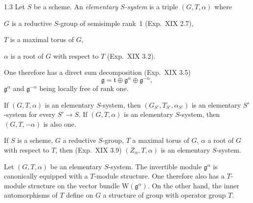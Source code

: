 \begin{definition}{1.3}\label{XX.1.3}
Let $S$ be a scheme. An \emph{elementary $S$-system} is a triple $(G,T,\alpha)$ where
\begin{enumeratei}
\item $G$ is a reductive $S$-group of semisimple rank~1 (Exp.~XIX 2.7),
\item $T$ is a maximal torus of $G$,
\item $\alpha$ is a root of $G$ with respect to $T$ (Exp.~XIX 3.2).
\end{enumeratei}
\end{definition}
One therefore has a direct sum decomposition (Exp.~XIX 3.5){\renewcommand{\thefootnote}{(1)}}
\[
\mathfrak g=\mathfrak t\oplus\mathfrak g^\alpha\oplus\mathfrak g^{-\alpha},
\]
$\mathfrak g^\alpha$ and $\mathfrak g^{-\alpha}$ being locally free of rank one.

 If $(G,T,\alpha)$ is an elementary $S$-system, then $(G_{S'},T_{S'},\alpha_{S'})$ is an elementary $S'$-system for every $S'\to S$. If $(G,T,\alpha)$ is an elementary $S$-system, then $(G,T,-\alpha)$ is also one.

If $S$ is a scheme, $G$ a reductive $S$-group, $T$ a maximal torus of $G$, $\alpha$ a root of $G$ with respect to $T$, then (Exp.~XIX 3.9) $(Z_\alpha,T,\alpha)$ is an elementary $S$-system.

Let $(G,T,\alpha)$ be an elementary $S$-system. The invertible module $\mathfrak g^\alpha$ is canonically equipped with a $T$-module structure. One therefore also has a $T$-module structure on the vector bundle $\mathrm W(\mathfrak g^\alpha)$. On the other hand, the inner automorphisms of $T$ define on $G$ a structure of group with operator group $T$.

